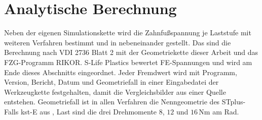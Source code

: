 
\section{Analytische Berechnung}
\label{sec:analytik}

Neben der eigenen Simulationskette wird die Zahnfußspannung je Laststufe mit weiteren Verfahren bestimmt und in  nebeneinander gestellt. Das sind die Berechnung nach VDI 2736 Blatt 2 \cite[S.~11 bis 14]{VDI2736-2} mit der Geometriekette dieser Arbeit und das FZG-Programm RIKOR. S-Life Plastics bewertet FE-Spannungen und wird am Ende dieses Abschnitts eingeordnet. Jeder Fremdwert wird mit Programm, Version, Bericht, Datum und Geometriefall in einer Eingabedatei der Werkzeugkette festgehalten, damit die Vergleichsbilder aus einer Quelle entstehen. Geometriefall ist in allen Verfahren die Nenngeometrie des STplus-Falls kst-E aus , Last sind die drei Drehmomente $8$, $12$ und $16$\,Nm am Rad.

